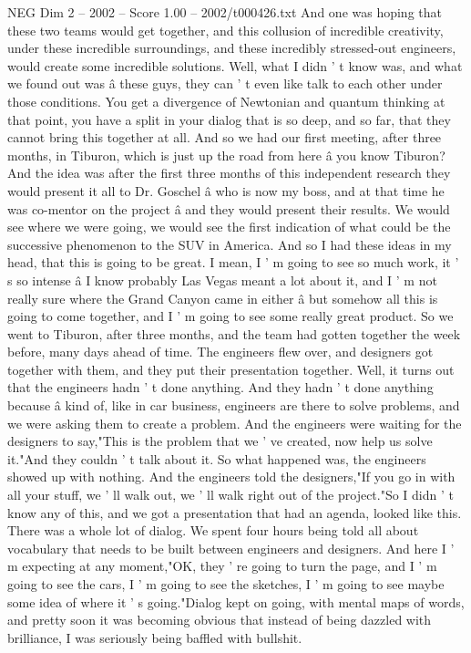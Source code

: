 \begin{textsample}{NEG Dim 2 – 2002 – Score 1.00 – 2002/t000426.txt}
And one was hoping that these two teams would get together, and this collusion of incredible creativity, under these incredible surroundings, and these incredibly stressed-out engineers, would create some incredible solutions.
Well, what I didn ' t know was, and what we found out was â these guys, they can ' t even like talk to each other under those conditions.
You get a divergence of Newtonian and quantum thinking at that point, you have a split in your dialog that is so deep, and so far, that they cannot bring this together at all.
And so we had our first meeting, after three months, in Tiburon, which is just up the road from here â you know Tiburon?
And the idea was after the first three months of this independent research they would present it all to Dr.
Goschel â who is now my boss, and at that time he was co-mentor on the project â and they would present their results.
We would see where we were going, we would see the first indication of what could be the successive phenomenon to the SUV in America.
And so I had these ideas in my head, that this is going to be great.
I mean, I ' m going to see so much work, it ' s so intense â I know probably Las Vegas meant a lot about it, and I ' m not really sure where the Grand Canyon came in either â but somehow all this is going to come together, and I ' m going to see some really great product.
So we went to Tiburon, after three months, and the team had gotten together the week before, many days ahead of time.
The engineers flew over, and designers got together with them, and they put their presentation together.
Well, it turns out that the engineers hadn ' t done anything.
And they hadn ' t done anything because â kind of, like in car business, engineers are there to solve problems, and we were asking them to create a problem.
And the engineers were waiting for the designers to say,"This is the problem that we ' ve created, now help us solve it."And they couldn ' t talk about it.
So what happened was, the engineers showed up with nothing.
And the engineers told the designers,"If you go in with all your stuff, we ' ll walk out, we ' ll walk right out of the project."So I didn ' t know any of this, and we got a presentation that had an agenda, looked like this.
There was a whole lot of dialog.
We spent four hours being told all about vocabulary that needs to be built between engineers and designers.
And here I ' m expecting at any moment,"OK, they ' re going to turn the page, and I ' m going to see the cars, I ' m going to see the sketches, I ' m going to see maybe some idea of where it ' s going."Dialog kept on going, with mental maps of words, and pretty soon it was becoming obvious that instead of being dazzled with brilliance, I was seriously being baffled with bullshit.

\end{textsample}
